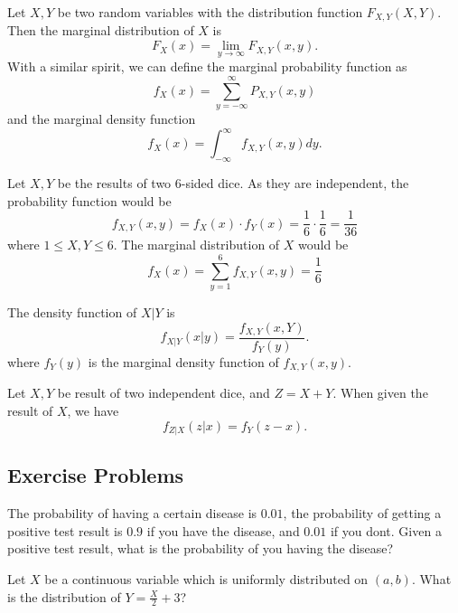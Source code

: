 \begin{definition}
	Let \(X, Y\) be two random variables with the distribution function \(F _{X, Y}(X,Y)\). Then the marginal distribution of \(X\) is
	\[
		F_X(x) = \lim_{y \rightarrow \infty } F_{X, Y}(x, y).
	\]
	With a similar spirit, we can define the marginal probability function as
	\[
		f_X(x) = \sum_{y = - \infty } ^{\infty } P _{X, Y}(x, y)
	\]
	and the marginal density function
	\[
		f_X(x) = \int_{-\infty }^{\infty} f _{X, Y}(x,y) dy.
	\]
\end{definition}

\begin{example}
	Let \(X, Y\) be the results of two 6-sided dice. As they are independent, the probability function would be
	\[
		f _{X, Y}(x, y) = f _X(x)  \cdot f_Y (x) = \frac{1}{6}  \cdot \frac{1}{6} = \frac{1}{36}
	\]
	where \(1 \leq X, Y \leq 6\).
	The marginal distribution of \(X\) would be
	\[
		f _{X}(x) = \sum_{y=1}^{6} f _{X, Y} (x, y) = \frac{1}{6} 
	\]
	
\end{example}

\begin{definition}
	The density function of \(X | Y\) is
	\[
		f _{X|Y}(x|y) = \frac{f _{X, Y}(x, Y)}{f _{Y}(y)}.
	\]
	where \(f _{Y}(y)\) is the marginal density function of \(f _{X, Y}(x, y)\).
\end{definition}

\begin{example}
	Let \(X, Y\) be result of two independent dice, and \(Z = X+Y\). When given the result of \(X\), we have 
	\[
		f _{Z| X}(z| x) = f _{Y}(z-x).
	\]
\end{example}


\subsection{Exercise Problems}

\begin{problem}
	The probability of having a certain disease is \(0.01\), the probability of getting a positive test result is \(0.9\) if you have the disease, and \(0.01\) if you dont. Given a positive test result, what is the probability of you having the disease?
\end{problem}

\begin{problem}
	Let \(X\) be a continuous variable which is uniformly distributed on \((a, b)\). What is the distribution of \(Y = \frac{X}{2} + 3\)?
\end{problem}

